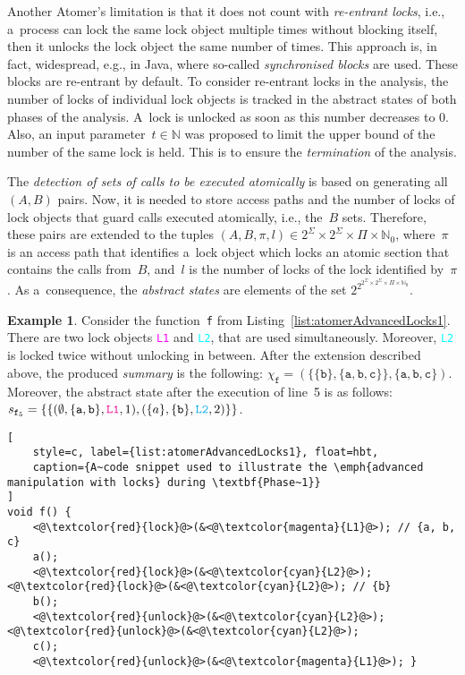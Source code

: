 \documentclass{ExcelAtFIT}
\theoremstyle{definition}
\newtheorem{example}{Example}[section]
\begin{document}
Another Atomer's limitation is that it does not count with \emph{re-entrant locks}, i.e., a~process can lock the same lock object multiple times without blocking itself, then it unlocks the lock object the same number of times. This approach is, in fact, widespread, e.g., in Java, where so-called \emph{synchronised blocks} are used. These blocks are re-entrant by default. To consider re-entrant locks in the analysis, the number of locks of individual lock objects is tracked in the abstract states of both phases of the analysis. A~lock is unlocked as soon as this number decreases to 0. Also, an input parameter~$ t \in \mathbb{N} $ was proposed to limit the upper bound of the number of the same lock is held. This is to ensure the \emph{termination} of the analysis.

The \emph{detection of sets of calls to be executed atomically} is based on generating all ${ (A, B) }$ pairs. Now, it is needed to store access paths and the number of locks of lock objects that guard calls executed atomically, i.e., the~$ B $ sets. Therefore, these pairs are extended to the tuples $ {(A, B, \pi, l)} \in 2^\Sigma \times 2^\Sigma \times \Pi \times \mathbb{N}_0 $, where~$ \pi $ is an access path that identifies a~lock object which locks an atomic section that contains the calls from~$ B $, and~$ l $ is the number of locks of the lock identified by~$ \pi $. As a~consequence, the \emph{abstract states} are elements of the set $ 2^{2^{2^\Sigma \times 2^\Sigma \times \Pi \times \mathbb{N}_0}} $.

\begin{example}
    Consider the function~\texttt{f} from Listing~\ref{list:atomerAdvancedLocks1}. There are two lock objects \textcolor{magenta}{\texttt{L1}} and \textcolor{cyan}{\texttt{L2}}, that are used simultaneously. Moreover, \textcolor{cyan}{\texttt{L2}} is locked twice without unlocking in between. After the extension described above, the produced \emph{summary} is the following: $ \chi_\mathtt{f} = ({\{\{\mathtt{b}\}, \{\mathtt{a}, \mathtt{b}, \mathtt{c}\}\}}, {\{\mathtt{a}, \mathtt{b}, \mathtt{c}\}}) $. Moreover, the abstract state after the execution of line~5 is as follows: $ s_{\mathtt{f}_5} = \{\{{(\emptyset, \{\mathtt{a, b}\}, \textcolor{magenta}{\mathtt{L1}}, 1)}, {(\{a\}, \{\mathtt{b}\}, \textcolor{cyan}{\mathtt{L2}}, 2)}\}\} $.
\end{example}

\begin{lstlisting}[
    style=c, label={list:atomerAdvancedLocks1}, float=hbt,
    caption={A~code snippet used to illustrate the \emph{advanced manipulation with locks} during \textbf{Phase~1}}
]
void f() {
    <@\textcolor{red}{lock}@>(&<@\textcolor{magenta}{L1}@>); // {a, b, c}
    a();
    <@\textcolor{red}{lock}@>(&<@\textcolor{cyan}{L2}@>); <@\textcolor{red}{lock}@>(&<@\textcolor{cyan}{L2}@>); // {b}
    b();
    <@\textcolor{red}{unlock}@>(&<@\textcolor{cyan}{L2}@>); <@\textcolor{red}{unlock}@>(&<@\textcolor{cyan}{L2}@>);
    c();
    <@\textcolor{red}{unlock}@>(&<@\textcolor{magenta}{L1}@>); }
\end{lstlisting}
\end{document}
